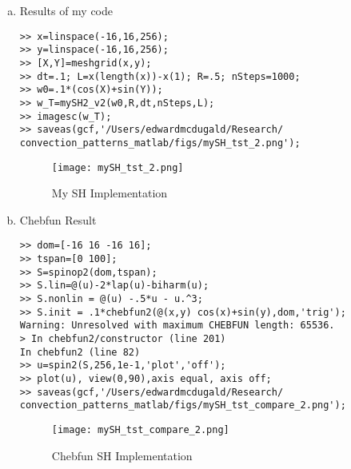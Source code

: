 \documentclass[12pt]{article}
\begin{document}
\begin{enumerate}[(a)]
    \item Results of my code
        \begin{verbatim}
>> x=linspace(-16,16,256);
>> y=linspace(-16,16,256);
>> [X,Y]=meshgrid(x,y);
>> dt=.1; L=x(length(x))-x(1); R=.5; nSteps=1000;
>> w0=.1*(cos(X)+sin(Y));
>> w_T=mySH2_v2(w0,R,dt,nSteps,L);
>> imagesc(w_T);
>> saveas(gcf,'/Users/edwardmcdugald/Research/
convection_patterns_matlab/figs/mySH_tst_2.png');
        \end{verbatim}
     \begin{figure}[ht]
        \centering
        \texttt{[image: mySH\_tst\_2.png]}
        \caption{My SH Implementation}
    \end{figure}

    \item Chebfun Result
        \begin{verbatim}
>> dom=[-16 16 -16 16];
>> tspan=[0 100];
>> S=spinop2(dom,tspan);
>> S.lin=@(u)-2*lap(u)-biharm(u);
>> S.nonlin = @(u) -.5*u - u.^3;
>> S.init = .1*chebfun2(@(x,y) cos(x)+sin(y),dom,'trig');
Warning: Unresolved with maximum CHEBFUN length: 65536. 
> In chebfun2/constructor (line 201)
In chebfun2 (line 82) 
>> u=spin2(S,256,1e-1,'plot','off');
>> plot(u), view(0,90),axis equal, axis off;
>> saveas(gcf,'/Users/edwardmcdugald/Research/
convection_patterns_matlab/figs/mySH_tst_compare_2.png');
        \end{verbatim}
 \begin{figure}[ht]
        \centering
        \texttt{[image: mySH\_tst\_compare\_2.png]}
        \caption{Chebfun SH Implementation}
    \end{figure}
    \FloatBarrier
\end{enumerate}
\end{document}
